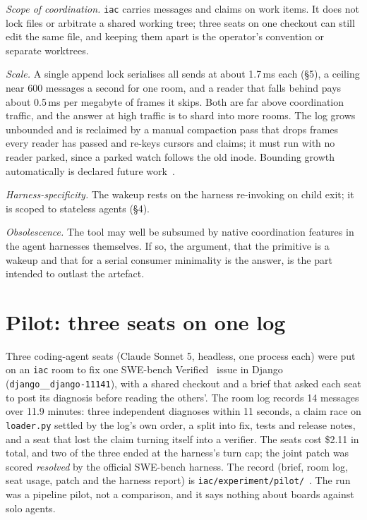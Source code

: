 \documentclass[11pt]{article}
\newcommand{\code}[1]{\texttt{#1}}
\begin{document}
\emph{Scope of coordination.} \code{iac} carries messages and claims on work items. It does not lock files or arbitrate a shared working tree; three seats on one checkout can still edit the same file, and keeping them apart is the operator's convention or separate worktrees.

\emph{Scale.} A single append lock serialises all sends at about 1.7\,ms each (\S5), a ceiling near 600 messages a second for one room, and a reader that falls behind pays about 0.5\,ms per megabyte of frames it skips. Both are far above coordination traffic, and the answer at high traffic is to shard into more rooms. The log grows unbounded and is reclaimed by a manual compaction pass that drops frames every reader has passed and re-keys cursors and claims; it must run with no reader parked, since a parked watch follows the old inode. Bounding growth automatically is declared future work~\cite{repo}.

\emph{Harness-specificity.} The wakeup rests on the harness re-invoking on child exit; it is scoped to stateless agents (\S4).

\emph{Obsolescence.} The tool may well be subsumed by native coordination features in the agent harnesses themselves. If so, the argument, that the primitive is a wakeup and that for a serial consumer minimality is the answer, is the part intended to outlast the artefact.

\section{Pilot: three seats on one log}

Three coding-agent seats (Claude Sonnet 5, headless, one process each) were put on an \code{iac} room to fix one SWE-bench Verified~\cite{swebench} issue in Django (\code{django\_\_django-11141}), with a shared checkout and a brief that asked each seat to post its diagnosis before reading the others'. The room log records 14 messages over 11.9 minutes: three independent diagnoses within 11 seconds, a claim race on \code{loader.py} settled by the log's own order, a split into fix, tests and release notes, and a seat that lost the claim turning itself into a verifier. The seats cost \$2.11 in total, and two of the three ended at the harness's turn cap; the joint patch was scored \emph{resolved} by the official SWE-bench harness. The record (brief, room log, seat usage, patch and the harness report) is \code{iac/experiment/pilot/}~\cite{tokenbill}. The run was a pipeline pilot, not a comparison, and it says nothing about boards against solo agents.
\end{document}
